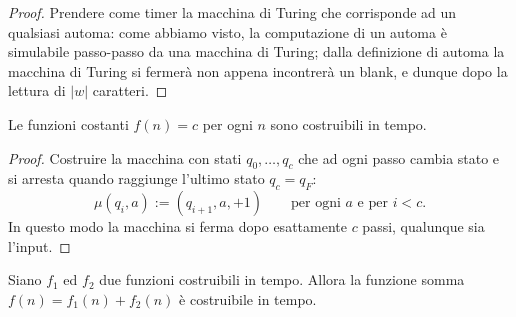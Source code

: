 \begin{proof}
Prendere come timer la macchina di Turing che corrisponde ad un qualsiasi automa: come abbiamo visto, la computazione di un automa è simulabile passo-passo da una macchina di Turing; dalla definizione di automa la macchina di Turing si fermerà non appena incontrerà un blank, e dunque dopo la lettura di $|w|$ caratteri.
\end{proof}

\begin{lemm}
Le funzioni costanti $f(n)=c$ per ogni $n$ sono costruibili in tempo.
\end{lemm}

\begin{proof}
Costruire la macchina con stati $q_0,\dots,q_c$ che ad ogni passo cambia stato e si arresta quando raggiunge l'ultimo stato $q_c=q_F$:
\[
\mu(q_i,a):=(q_{i+1},a,+1)\qquad\text{per ogni } a \text{ e per } i<c.
\]
In questo modo la macchina si ferma dopo esattamente $c$ passi, qualunque sia l'input.
\end{proof}

\begin{lemm}
Siano $f_1$ ed $f_2$ due funzioni costruibili in tempo. Allora la funzione somma $f(n)=f_1(n)+f_2(n)$ \`e costruibile in tempo.
\end{lemm}

